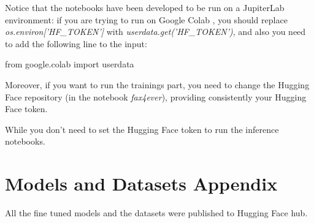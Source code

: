 \documentclass[11pt]{article}
\begin{document}
Notice that the notebooks have been developed to be run on a JupiterLab
environment: if you are trying to run on Google Colab , you should replace 
\emph{os.environ['HF\_TOKEN']} with 
\emph{userdata.get('HF\_TOKEN')}, and also you need to add the following line to the input:

from google.colab import userdata

Moreover, if you want to run the trainings part, you need to change 
the Hugging Face repository (in the notebook \emph{fax4ever}),
providing consistently your Hugging Face token.

While you don't need to set the Hugging Face token to
run the inference notebooks.

\section{Models and Datasets Appendix}
\label{sec:appendix3}

All the fine tuned models and the datasets were published to Hugging Face 
hub.


\end{document}
